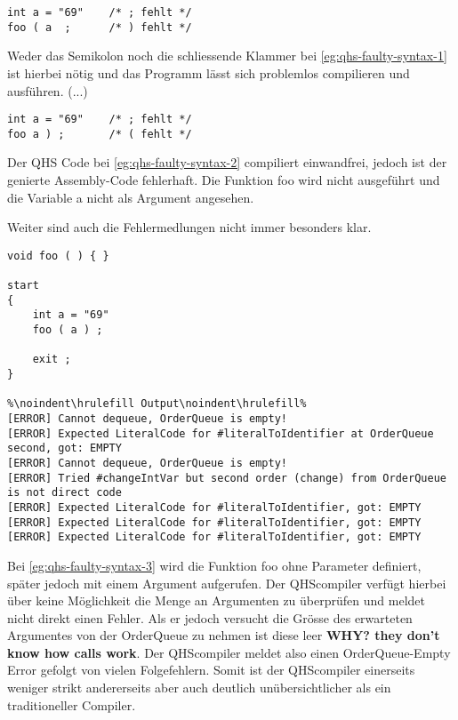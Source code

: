\begin{lstlisting}[language=QHS, caption=QHS mit fehlenden Tokens, label=eg:qhs-faulty-syntax-1]
int a = "69"    /* ; fehlt */
foo ( a  ;      /* ) fehlt */
\end{lstlisting}

Weder das Semikolon noch die schliessende Klammer bei \ref{eg:qhs-faulty-syntax-1} ist hierbei nötig und das Programm lässt sich problemlos compilieren und ausführen. (...)

\begin{lstlisting}[language=QHS, caption=QHS mit fehlender (, label=eg:qhs-faulty-syntax-2]
int a = "69"    /* ; fehlt */
foo a ) ;       /* ( fehlt */
\end{lstlisting}

Der QHS Code bei \ref{eg:qhs-faulty-syntax-2} compiliert einwandfrei, jedoch ist der genierte Assembly-Code fehlerhaft. Die Funktion foo wird nicht ausgeführt und die Variable a nicht als Argument angesehen.

Weiter sind auch die Fehlermedlungen nicht immer besonders klar.

\begin{lstlisting}[language=QHS, caption=QHS mit falscher Anzahl Argumente, label=eg:qhs-faulty-syntax-3]
void foo ( ) { }

start
{
    int a = "69" 
    foo ( a ) ;

    exit ;
}

%\noindent\hrulefill Output\noindent\hrulefill%
[ERROR] Cannot dequeue, OrderQueue is empty!
[ERROR] Expected LiteralCode for #literalToIdentifier at OrderQueue second, got: EMPTY
[ERROR] Cannot dequeue, OrderQueue is empty!
[ERROR] Tried #changeIntVar but second order (change) from OrderQueue is not direct code
[ERROR] Expected LiteralCode for #literalToIdentifier, got: EMPTY
[ERROR] Expected LiteralCode for #literalToIdentifier, got: EMPTY
[ERROR] Expected LiteralCode for #literalToIdentifier, got: EMPTY
\end{lstlisting}

Bei \ref{eg:qhs-faulty-syntax-3} wird die Funktion foo ohne Parameter definiert, später jedoch mit einem Argument aufgerufen. Der QHScompiler verfügt hierbei über keine Möglichkeit die Menge an Argumenten zu überprüfen
und meldet nicht direkt einen Fehler. Als er jedoch versucht die Grösse des erwarteten Argumentes von der OrderQueue zu nehmen ist diese leer \textbf{WHY? they don't know how calls work}.
Der QHScompiler meldet also einen OrderQueue-Empty Error gefolgt von vielen Folgefehlern.
Somit ist der QHScompiler einerseits weniger strikt andererseits aber auch deutlich unübersichtlicher als ein traditioneller Compiler.

